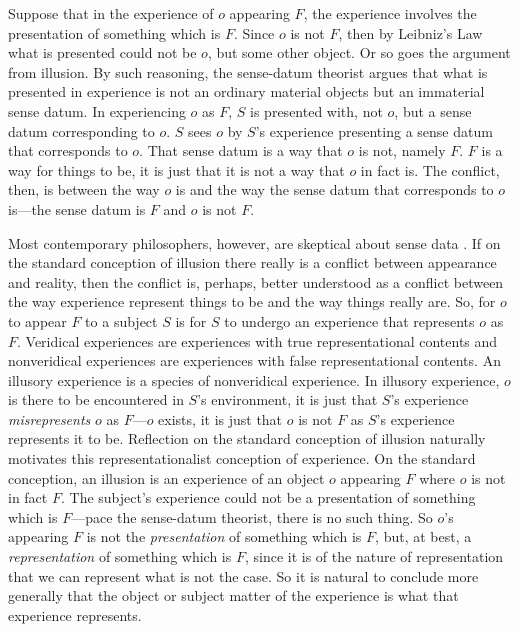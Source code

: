\documentclass[12pt]{article}
\begin{document}
Suppose that in the experience of \( o \) appearing \( F \), the experience involves the presentation of something which is \( F \). Since \( o \) is not \( F \), then by Leibniz's Law what is presented could not be \( o \), but some other object. Or so goes the argument from illusion. By such reasoning, the sense-datum theorist argues that what is presented in experience is not an ordinary material objects but an immaterial sense datum.  In experiencing \( o \) as \( F \), \( S \) is presented with, not \( o \), but a sense datum corresponding to \( o \). \( S \) sees \( o \) by \( S \)'s experience presenting a sense datum that corresponds to \( o \).  That sense datum is a way that \( o \) is not, namely \( F \). \( F \) is a way for things to be, it is just that it is not a way that \( o \) in fact is. The conflict, then, is between the way \( o \) is and the way the sense datum that corresponds to \( o \) is---the sense datum is \( F \) and \( o \) is not \( F \). 

Most contemporary philosophers, however, are skeptical about sense data \citep[though see][]{robinson94}. If on the standard conception of illusion there really is a conflict between appearance and reality, then the conflict is, perhaps, better understood as a conflict between the way experience represent things to be and the way things really are. So, for \( o \) to appear \( F \) to a subject \( S \) is for \( S \) to undergo an experience that represents \( o \) as \( F \). Veridical experiences are experiences with true representational contents and nonveridical experiences are experiences with false representational contents. An illusory experience is a species of nonveridical experience. In illusory experience, \( o \) is there to be encountered in \( S \)'s environment, it is just that \( S \)'s experience \emph{misrepresents} \( o \) as \( F \)---\( o \) exists, it is just that \( o \) is not \( F \) as \( S \)'s experience represents it to be. Reflection on the standard conception of illusion naturally motivates this representationalist conception of experience. On the standard conception, an illusion is an experience of an object \( o \) appearing \( F \) where \( o \) is not in fact \( F \). The subject's experience could not be a presentation of something which is \( F \)---pace the sense-datum theorist, there is no such thing. So \( o \)'s appearing \( F \) is not the \emph{presentation} of something which is \( F \), but, at best, a \emph{representation} of something which is \( F \), since it is of the nature of representation that we can represent what is not the case. So it is natural to conclude more generally that the object or subject matter of the experience is what that experience represents.
\end{document}
